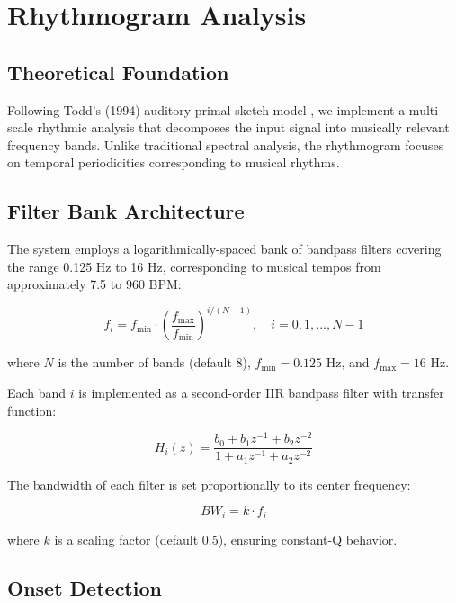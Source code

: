 \documentclass[11pt,a4paper]{article}
\begin{document}
\section{Rhythmogram Analysis}

\subsection{Theoretical Foundation}

Following Todd's (1994) auditory primal sketch model \cite{todd1994}, we implement a multi-scale rhythmic analysis that decomposes the input signal into musically relevant frequency bands. Unlike traditional spectral analysis, the rhythmogram focuses on temporal periodicities corresponding to musical rhythms.

\subsection{Filter Bank Architecture}

The system employs a logarithmically-spaced bank of bandpass filters covering the range 0.125 Hz to 16 Hz, corresponding to musical tempos from approximately 7.5 to 960 BPM:

\begin{equation}
f_i = f_{\min} \cdot \left(\frac{f_{\max}}{f_{\min}}\right)^{i/(N-1)}, \quad i = 0, 1, \ldots, N-1
\end{equation}

\noindent where $N$ is the number of bands (default 8), $f_{\min} = 0.125$ Hz, and $f_{\max} = 16$ Hz.

Each band $i$ is implemented as a second-order IIR bandpass filter with transfer function:

\begin{equation}
H_i(z) = \frac{b_0 + b_1 z^{-1} + b_2 z^{-2}}{1 + a_1 z^{-1} + a_2 z^{-2}}
\end{equation}

The bandwidth of each filter is set proportionally to its center frequency:

\begin{equation}
BW_i = k \cdot f_i
\end{equation}

\noindent where $k$ is a scaling factor (default 0.5), ensuring constant-Q behavior.

\subsection{Onset Detection}
\end{document}
